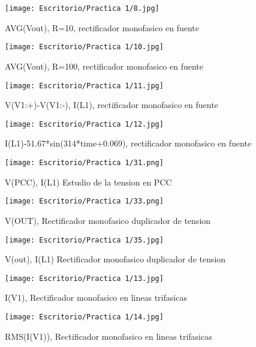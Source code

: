 \documentclass[11pt,a4paper]{article}
\begin{document}
\begin{figure}[hbtp]
\centering
\texttt{[image: Escritorio/Practica 1/8.jpg]}
\caption{AVG(Vout), R=10, rectificador monofasico en fuente}
\end{figure}


\begin{figure}[hbtp]
\centering
\texttt{[image: Escritorio/Practica 1/10.jpg]}
\caption{AVG(Vout), R=100, rectificador monofasico en fuente}
\end{figure}

\begin{figure}[hbtp]
\centering
\texttt{[image: Escritorio/Practica 1/11.jpg]}
\caption{V(V1:+)-V(V1:-), I(L1), rectificador monofasico en fuente}
\end{figure}


\begin{figure}[hbtp]
\centering
\texttt{[image: Escritorio/Practica 1/12.jpg]}
\caption{I(L1)-51.67*sin(314*time+0.069), rectificador monofasico en fuente}
\end{figure}


\begin{figure}[hbtp]
\centering
\texttt{[image: Escritorio/Practica 1/31.png]}
\caption{V(PCC), I(L1) Estudio de la tension en PCC}
\end{figure}

\begin{figure}[hbtp]
\centering
\texttt{[image: Escritorio/Practica 1/33.png]}
\caption{V(OUT), Rectificador monofasico duplicador de tension}
\end{figure}

\begin{figure}[hbtp]
\centering
\texttt{[image: Escritorio/Practica 1/35.jpg]}
\caption{V(out), I(L1)  Rectificador monofasico duplicador de tension}
\end{figure}

\begin{figure}[hbtp]
\centering
\texttt{[image: Escritorio/Practica 1/13.jpg]}
\caption{I(V1), Rectificador monofasico en lineas trifasicas}
\end{figure}


\begin{figure}[hbtp]
\centering
\texttt{[image: Escritorio/Practica 1/14.jpg]}
\caption{RMS(I(V1)), Rectificador monofasico en lineas trifasicas}
\end{figure}
\end{document}
